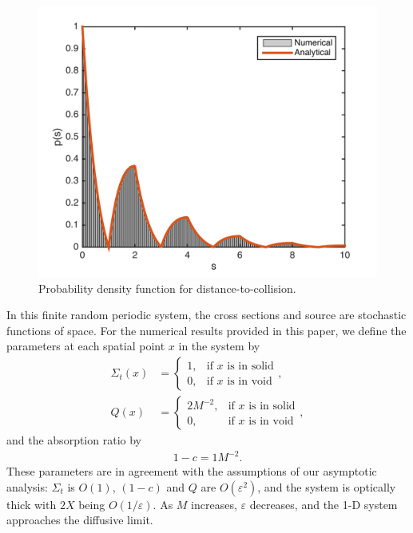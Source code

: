 \documentclass{anstrans}
\begin{document}
\begin{figure}[b] %
  \centering
  \includegraphics[scale=0.7]{prob}
  \caption{Probability density function for distance-to-collision.}
  \label{fig1}
\end{figure}
In this finite random periodic system, the cross sections and source are stochastic functions of space. For the numerical results provided in this paper, we define the parameters at each spatial point $x$ in the system by
\begin{align}
\Sigma_t(x) &= \left\{\begin{array}{cc} 1, & \text{if $x$ is in solid} \\ 0, & \text{if $x$ is in void} \end{array}\right. ,\nonumber\\
Q(x) &= \left\{\begin{array}{cc} 2M^{-2}, & \text{if $x$ is in solid} \\ 0, & \text{if $x$ is in void} \end{array}\right. \nonumber,
\end{align}
and the absorption ratio by
\begin{align}
1-c = 1M^{-2}.\nonumber
\end{align}
These parameters are in agreement with the assumptions of our asymptotic analysis: $\Sigma_{t}$ is $O(1)$, $(1-c)$ and $Q$ are $O(\varepsilon^2)$, and the system is optically thick with $2X$ being $O(1/\varepsilon)$.
As $M$ increases, $\varepsilon$ decreases, and the 1-D system approaches the diffusive limit.
\end{document}

